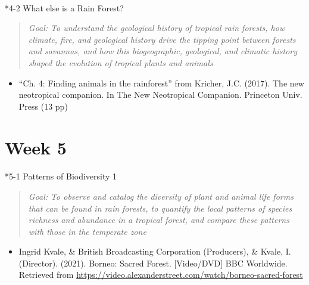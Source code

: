 \documentclass[
  10pt,
  letterpaper,
  oneside,
  open=any]{scrbook}
\makeatletter
\let\oldparagraph\paragraph
\renewcommand{\paragraph}{
    \@ifstar
      \xxxParagraphStar
      \xxxParagraphNoStar
  }
\newcommand{\xxxParagraphStar}[1]{\oldparagraph*{#1}\mbox{}}
\newcommand{\xxxParagraphNoStar}[1]{\oldparagraph{#1}\mbox{}}
\providecommand{\tightlist}{%
  \setlength{\itemsep}{0pt}\setlength{\parskip}{0pt}}
\makeatother
\begin{document}
\paragraph*{4-2 What else is a Rain
Forest?}\label{what-else-is-a-rain-forest}

\begin{quote}
\emph{Goal: To understand the geological history of tropical rain
forests, how climate, fire, and geological history drive the tipping
point between forests and savannas, and how this biogeographic,
geological, and climatic history shaped the evolution of tropical plants
and animals}
\end{quote}

\begin{itemize}
\tightlist
\item
  ``Ch. 4: Finding animals in the rainforest'' from Kricher, J.C.
  (2017). The new neotropical companion. In The New Neotropical
  Companion. Princeton Univ. Press (13 pp)
\end{itemize}

\section*{Week 5}\label{week-5}


\paragraph*{5-1 Patterns of Biodiversity
1}\label{patterns-of-biodiversity-1}

\begin{quote}
\emph{Goal: To observe and catalog the diversity of plant and animal
life forms that can be found in rain forests, to quantify the local
patterns of species richness and abundance in a tropical forest, and
compare these patterns with those in the temperate zone}
\end{quote}

\begin{itemize}
\tightlist
\item
  Ingrid Kvale, \& British Broadcasting Corporation (Producers), \&
  Kvale, I. (Director). (2021). Borneo: Sacred Forest. {[}Video/DVD{]}
  BBC Worldwide. Retrieved from
  \url{https://video.alexanderstreet.com/watch/borneo-sacred-forest}
\end{itemize}
\end{document}
